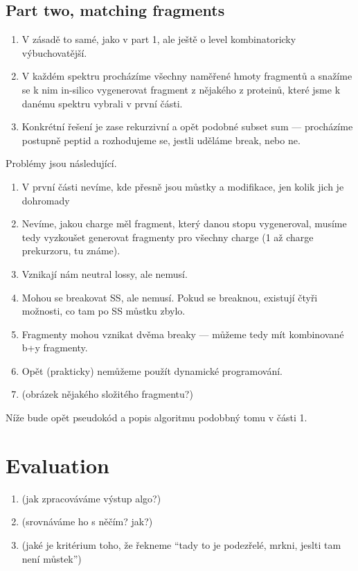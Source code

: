 \subsection{Part two, matching fragments}

\begin{enumerate}
	\item V zásadě to samé, jako v part 1, ale ještě o level kombinatoricky výbuchovatější.
	\item V každém spektru procházíme všechny naměřené hmoty fragmentů a snažíme se k nim in-silico vygenerovat fragment z nějakého z proteinů, které jsme k danému spektru vybrali v první části.
	\item Konkrétní řešení je zase rekurzivní a opět podobné subset sum — procházíme postupně peptid a rozhodujeme se, jestli uděláme break, nebo ne.
\end{enumerate}

Problémy jsou následující.

\begin{enumerate}
	\item V první části nevíme, kde přesně jsou můstky a modifikace, jen kolik jich je dohromady
	\item Nevíme, jakou charge měl fragment, který danou stopu vygeneroval, musíme tedy vyzkoušet generovat fragmenty pro všechny charge (1 až charge prekurzoru, tu známe).
	\item Vznikají nám neutral lossy, ale nemusí.
	\item Mohou se breakovat SS, ale nemusí. Pokud se breaknou, existují čtyři možnosti, co tam po SS můstku zbylo.
	\item Fragmenty mohou vznikat dvěma breaky — můžeme tedy mít kombinované b+y fragmenty.
	\item Opět (prakticky) nemůžeme použít dynamické programování.
	\item (obrázek nějakého složitého fragmentu?)
\end{enumerate}

Níže bude opět pseudokód a popis algoritmu podobbný tomu v části 1.

\section{Evaluation}

\begin{enumerate}
	\item (jak zpracováváme výstup algo?)
	\item (srovnáváme ho s něčím? jak?)
	\item (jaké je kritérium toho, že řekneme ``tady to je podezřelé, mrkni, jeslti tam není můstek'')
\end{enumerate}


